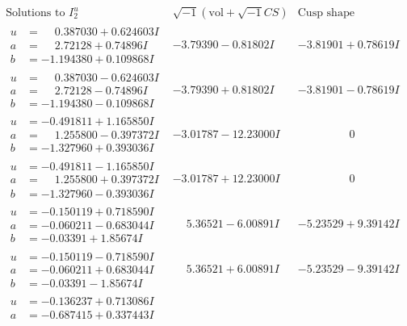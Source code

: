 \documentclass[1p]{elsarticle_modified}
\theoremstyle{definition}
\newcommand{\I}{\sqrt{-1}}
\begin{document}
$$\begin{array}{c|c|c}
\text{Solutions to }I^u_{2}& \I (\text{vol} + \sqrt{-1}CS) & \text{Cusp shape}\\
 \hline 
\begin{aligned}
u &= \phantom{-}0.387030 + 0.624603 I \\
a &= \phantom{-}2.72128 + 0.74896 I \\
b &= -1.194380 + 0.109868 I\end{aligned}
 & -3.79390 - 0.81802 I & -3.81901 + 0.78619 I \\ \hline\begin{aligned}
u &= \phantom{-}0.387030 - 0.624603 I \\
a &= \phantom{-}2.72128 - 0.74896 I \\
b &= -1.194380 - 0.109868 I\end{aligned}
 & -3.79390 + 0.81802 I & -3.81901 - 0.78619 I \\ \hline\begin{aligned}
u &= -0.491811 + 1.165850 I \\
a &= \phantom{-}1.255800 - 0.397372 I \\
b &= -1.327960 + 0.393036 I\end{aligned}
 & -3.01787 - 12.23000 I & \phantom{-0.000000 } 0 \\ \hline\begin{aligned}
u &= -0.491811 - 1.165850 I \\
a &= \phantom{-}1.255800 + 0.397372 I \\
b &= -1.327960 - 0.393036 I\end{aligned}
 & -3.01787 + 12.23000 I & \phantom{-0.000000 } 0 \\ \hline\begin{aligned}
u &= -0.150119 + 0.718590 I \\
a &= -0.060211 - 0.683044 I \\
b &= -0.03391 + 1.85674 I\end{aligned}
 & \phantom{-}5.36521 - 6.00891 I & -5.23529 + 9.39142 I \\ \hline\begin{aligned}
u &= -0.150119 - 0.718590 I \\
a &= -0.060211 + 0.683044 I \\
b &= -0.03391 - 1.85674 I\end{aligned}
 & \phantom{-}5.36521 + 6.00891 I & -5.23529 - 9.39142 I \\ \hline\begin{aligned}
u &= -0.136237 + 0.713086 I \\
a &= -0.687415 + 0.337443 I \\

\end{aligned}
\end{array}$$
\end{document}
